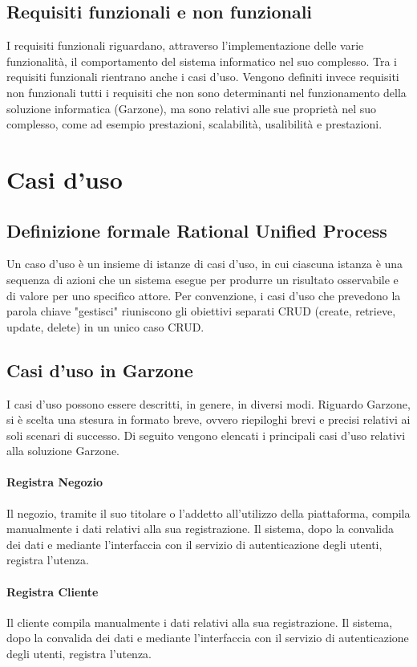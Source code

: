 \subsection{Requisiti funzionali e non funzionali}
I requisiti funzionali riguardano, attraverso l'implementazione delle varie funzionalità, il comportamento del sistema informatico nel suo complesso. Tra i requisiti funzionali rientrano anche i casi d'uso.
Vengono definiti invece requisiti non funzionali tutti i requisiti che non sono determinanti nel funzionamento della soluzione informatica (Garzone), ma sono relativi alle sue proprietà nel suo complesso, come ad esempio prestazioni, scalabilità, usalibilità e prestazioni.

\section{Casi d'uso}
\subsection{Definizione formale Rational Unified Process}
Un caso d'uso è un insieme di istanze di casi d'uso, in cui ciascuna istanza è una sequenza di azioni che un sistema esegue per produrre un risultato osservabile e di valore per uno specifico attore\cite{RUP}. Per convenzione, i casi d'uso che prevedono la parola chiave "gestisci" riuniscono gli obiettivi separati CRUD (create, retrieve, update, delete) in un unico caso CRUD.
\subsection{Casi d'uso in Garzone}
I casi d'uso possono essere descritti, in genere, in diversi modi. Riguardo Garzone, si è scelta una stesura in formato breve, ovvero riepiloghi brevi e precisi relativi ai soli scenari di successo. Di seguito vengono elencati i principali casi d'uso relativi alla soluzione Garzone.
\paragraph{Registra Negozio} Il negozio, tramite il suo titolare o l'addetto all'utilizzo della piattaforma, compila manualmente i dati relativi alla sua registrazione. Il sistema, dopo la convalida dei dati e mediante l'interfaccia con il servizio di autenticazione degli utenti, registra l'utenza.
\paragraph{Registra Cliente} Il cliente compila manualmente i dati relativi alla sua registrazione. Il sistema, dopo la convalida dei dati e mediante l'interfaccia con il servizio di autenticazione degli utenti, registra l'utenza.
